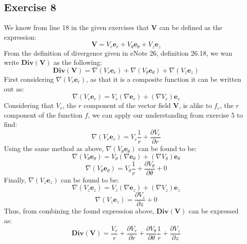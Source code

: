 \documentclass{article}
\begin{document}
\subsection{Exercise 8}
We know from line 18 in the given exercises that $\mathbf{V}$ can be defined as the expression:
\begin{equation}
    \mathbf{V} = V_{r}\mathbf{e}_{r}+V_{\theta}\mathbf{e}_{\theta}+V_{z}\mathbf{e}_{z}
\end{equation}
From the definition of divergence given in eNote 26, definition 26.18, we wan write $\mathbf{Div}\mathbf{(V)}$ as the following:
\begin{equation}
    \mathbf{Div}\mathbf{(V)} = \nabla (V_r\mathbf{e}_r)+\nabla (V_\theta\mathbf{e}_\theta)+\nabla (V_z\mathbf{e}_z)
\end{equation}
First considering $\nabla (V_r\mathbf{e}_r)$, as that it is a composite function it can be written out as:
\begin{equation}
    \nabla (V_r\mathbf{e}_r) = V_r(\nabla \mathbf{e}_r) + (\nabla V_r)\mathbf{e}_r
\end{equation}
Considering that $V_r$, the $r$ component of the vector field $\mathbf{V}$, is alike to $f_r$, the $r$ component of the function $f$, we can apply our understanding from exercise 5 to find:
\begin{equation}
    \nabla (V_r\mathbf{e}_r) = V_r \frac{1}{r} +\frac{\partial V_r}{\partial r}
\end{equation}
Using the same method as above, $\nabla (V_\theta\mathbf{e}_\theta)$ can be found to be:
\begin{equation}
     \nabla (V_\theta \mathbf{e}_\theta) = V_\theta(\nabla \mathbf{e}_\theta) + (\nabla V_\theta)\mathbf{e}_\theta
\end{equation}
\begin{equation}
     \nabla (V_\theta\mathbf{e}_\theta) = V_\theta \frac{1}{r} +\frac{\partial V_\theta}{\partial \theta}+0
\end{equation}
Finally, $\nabla (V_z\mathbf{e}_z)$ can be found to be:
\begin{equation}
     \nabla (V_z \mathbf{e}_z) = V_z(\nabla \mathbf{e}_z) + (\nabla V_z)\mathbf{e}_z
\end{equation}
\begin{equation}
     \nabla (V_z\mathbf{e}_z) = \frac{\partial V_z}{\partial z}+0
\end{equation}
Thus, from combining the found expression above, $\mathbf{Div}(\mathbf{V})$ can be expressed as:
\begin{equation}
  \mathbf{Div}\mathbf{(V)}=\frac{V_{r}}{r}+\frac{\partial V_{r}}{\partial  r}+\frac{\partial V_{\theta}}{\partial \theta}\frac{1}{r}+\frac{\partial V_{z}}{\partial z}
\end{equation}
\newpage
\end{document}

